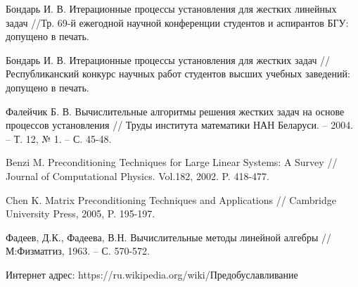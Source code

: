 \documentclass[a4paper,14pt]{extreport}
\begin{document}
\begin{thebibliography}{99}
Бондарь И. В. Итерационные процессы установления для жестких линейных задач //Тр. 69-й ежегодной научной конференции студентов и аспирантов БГУ: допущено в печать.

Бондарь И. В. Итерационные процессы установления для жестких задач //Республиканский конкурс научных работ студентов высших учебных заведений: допущено в печать.

Фалейчик Б. В. Вычислительные алгоритмы решения жестких задач на основе процессов установления // Труды института математики НАН Беларуси. -- 2004. -- Т. 12, № 1. -- С. 45-48.

Benzi M. Preconditioning Techniques for Large Linear Systems: A Survey // Journal of Computational Physics. Vol.182, 2002. P. 418-477.

Chen K. Matrix Preconditioning Techniques and Applications // Cambridge University Press, 2005, P. 195-197.

Фадеев, Д.К., Фадеева, В.Н. Вычислительные методы линейной алгебры // М:Физматгиз, 1963. -- С. 570-572.

 Интернет адрес: https://ru.wikipedia.org/wiki/Предобуславливание
\end{thebibliography}


  \appendix
\end{document}

